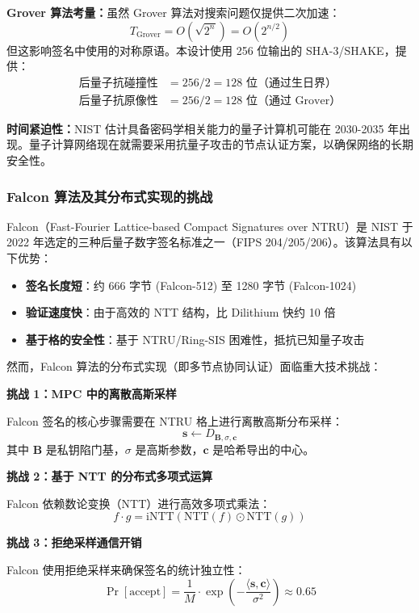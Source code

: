 \textbf{Grover 算法考量：}虽然 Grover 算法对搜索问题仅提供二次加速：
$$T_{\text{Grover}} = O(\sqrt{2^n}) = O(2^{n/2})$$
但这影响签名中使用的对称原语。本设计使用 256 位输出的 SHA-3/SHAKE，提供：
\begin{align}
\text{后量子抗碰撞性} &= 256/2 = 128 \text{ 位（通过生日界）} \\
\text{后量子抗原像性} &= 256/2 = 128 \text{ 位（通过 Grover）}
\end{align}

\textbf{时间紧迫性：}NIST 估计具备密码学相关能力的量子计算机可能在 2030-2035 年出现。量子计算网络现在就需要采用抗量子攻击的节点认证方案，以确保网络的长期安全性。

\subsubsection{Falcon 算法及其分布式实现的挑战}

Falcon（Fast-Fourier Lattice-based Compact Signatures over NTRU）是 NIST 于 2022 年选定的三种后量子数字签名标准之一（FIPS 204/205/206）。该算法具有以下优势：

\begin{itemize}
    \item \textbf{签名长度短}：约 666 字节 (Falcon-512) 至 1280 字节 (Falcon-1024)
    \item \textbf{验证速度快}：由于高效的 NTT 结构，比 Dilithium 快约 10 倍
    \item \textbf{基于格的安全性}：基于 NTRU/Ring-SIS 困难性，抵抗已知量子攻击
\end{itemize}

然而，Falcon 算法的分布式实现（即多节点协同认证）面临重大技术挑战：

\textbf{挑战 1：MPC 中的离散高斯采样}

Falcon 签名的核心步骤需要在 NTRU 格上进行离散高斯分布采样：
$$\mathbf{s} \leftarrow D_{\mathbf{B}, \sigma, \mathbf{c}}$$
其中 $\mathbf{B}$ 是私钥陷门基，$\sigma$ 是高斯参数，$\mathbf{c}$ 是哈希导出的中心。

\textbf{挑战 2：基于 NTT 的分布式多项式运算}

Falcon 依赖数论变换（NTT）进行高效多项式乘法：
$$f \cdot g = \text{iNTT}(\text{NTT}(f) \odot \text{NTT}(g))$$

\textbf{挑战 3：拒绝采样通信开销}

Falcon 使用拒绝采样来确保签名的统计独立性：
$$\Pr[\text{accept}] = \frac{1}{M} \cdot \exp\left(-\frac{\langle \mathbf{s}, \mathbf{c} \rangle}{\sigma^2}\right) \approx 0.65$$

